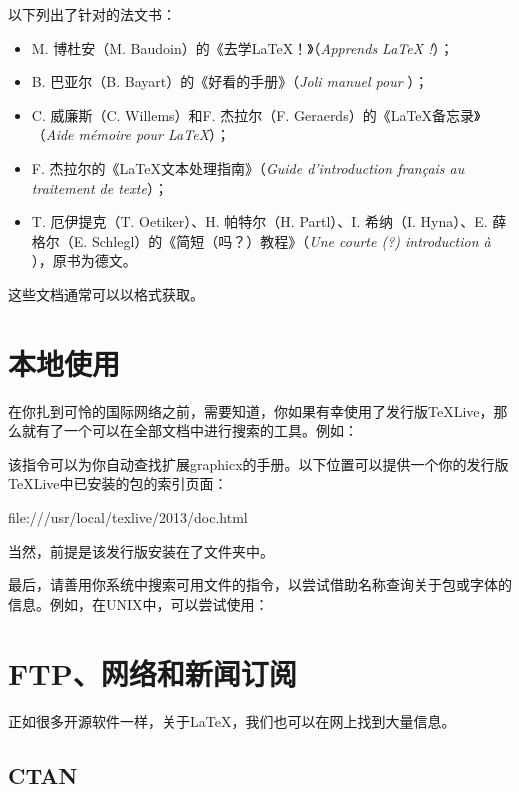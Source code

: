 以下列出了针对\LaTeXe 的法文书：

\begin{itemize}
    \item M. 博杜安（M. Baudoin）的《去学LaTeX！》（\emph{Apprends LaTeX !}）；
    \item B. 巴亚尔（B. Bayart）的《好看的\LaTeXe 手册》（\emph{Joli manuel pour \LaTeXe}）；
    \item C. 威廉斯（C. Willems）和F. 杰拉尔（F. Geraerds）的《\LaTeX 备忘录》（\emph{Aide mémoire pour \LaTeX}）；
    \item F. 杰拉尔的《\LaTeX 文本处理指南》（\emph{Guide d'introduction français au traitement de texte}）；
    \item T. 厄伊提克（T. Oetiker）、H. 帕特尔（H. Partl）、I. 希纳（I. Hyna）、E. 薛格尔（E. Schlegl）的《\LaTeXe 简短（吗？）教程》（\emph{Une courte (?) introduction à \LaTeXe}），原书为德文。
\end{itemize}

这些文档通常可以以格式获取。

\section{本地使用}

在你扎到可怜的国际网络之前，需要知道，你如果有幸使用了发行版\TeX Live，那么就有了一个可以在全部文档中进行搜索的工具。例如：


该指令可以为你自动查找扩展\textsf{graphicx}的手册。以下位置可以提供一个你的发行版\TeX Live中已安装的包的索引页面：

\begin{dmd}
file:///usr/local/texlive/2013/doc.html
\end{dmd}

当然，前提是该发行版安装在了文件夹中。

最后，请善用你系统中搜索可用文件的指令，以尝试借助名称查询关于包或字体的信息。例如，在UNIX中，可以尝试使用：


\section{FTP、网络和新闻订阅}

正如很多开源软件一样，关于\LaTeX ，我们也可以在网上找到大量信息。

\subsection{CTAN}

